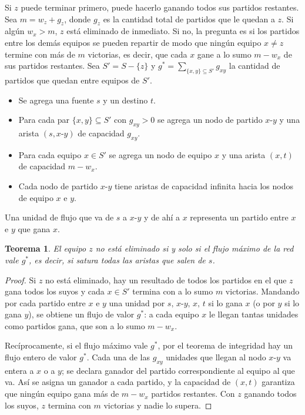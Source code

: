 \documentclass[12pt, spanish, oneside, openany]{book}
\theoremstyle{uprightplain}
\newtheorem{teorema}{Teorema}[section]
\theoremstyle{definition}
\theoremstyle{remark}
\theoremstyle{definition}
\begin{document}
Si $z$ puede terminar primero, puede hacerlo ganando todos sus partidos restantes. Sea $m=w_z+g_z$, donde $g_z$ es la cantidad total de partidos que le quedan a $z$. Si algún $w_x>m$, $z$ está eliminado de inmediato. Si no, la pregunta es si los partidos entre los demás equipos se pueden repartir de modo que ningún equipo $x\neq z$ termine con más de $m$ victorias, es decir, que cada $x$ gane a lo sumo $m-w_x$ de sus partidos restantes. Sea $S'=S-\{z\}$ y $g^{*}=\sum_{\{x,y\}\subseteq S'}g_{xy}$ la cantidad de partidos que quedan entre equipos de $S'$.

\begin{itemize}
    \item Se agrega una fuente $s$ y un destino $t$.
    \item Para cada par $\{x,y\}\subseteq S'$ con $g_{xy}>0$ se agrega un nodo de partido $x\text{-}y$ y una arista $(s,x\text{-}y)$ de capacidad $g_{xy}$.
    \item Para cada equipo $x\in S'$ se agrega un nodo de equipo $x$ y una arista $(x,t)$ de capacidad $m-w_x$.
    \item Cada nodo de partido $x\text{-}y$ tiene aristas de capacidad infinita hacia los nodos de equipo $x$ e $y$.
\end{itemize}
Una unidad de flujo que va de $s$ a $x\text{-}y$ y de ahí a $x$ representa un partido entre $x$ e $y$ que gana $x$.

\begin{teorema}
\label{teo:flujo-beisbol}
El equipo $z$ no está eliminado si y solo si el flujo máximo de la red vale $g^{*}$, es decir, si satura todas las aristas que salen de $s$.
\end{teorema}
\begin{proof}
Si $z$ no está eliminado, hay un resultado de todos los partidos en el que $z$ gana todos los suyos y cada $x\in S'$ termina con a lo sumo $m$ victorias. Mandando por cada partido entre $x$ e $y$ una unidad por $s,\,x\text{-}y,\,x,\,t$ si lo gana $x$ (o por $y$ si lo gana $y$), se obtiene un flujo de valor $g^{*}$: a cada equipo $x$ le llegan tantas unidades como partidos gana, que son a lo sumo $m-w_x$.

Recíprocamente, si el flujo máximo vale $g^{*}$, por el teorema de integridad hay un flujo entero de valor $g^{*}$. Cada una de las $g_{xy}$ unidades que llegan al nodo $x\text{-}y$ va entera a $x$ o a $y$; se declara ganador del partido correspondiente al equipo al que va. Así se asigna un ganador a cada partido, y la capacidad de $(x,t)$ garantiza que ningún equipo gana más de $m-w_x$ partidos restantes. Con $z$ ganando todos los suyos, $z$ termina con $m$ victorias y nadie lo supera.
\end{proof}
\end{document}
